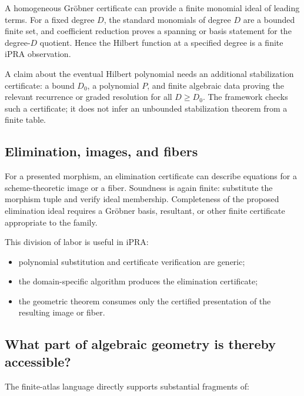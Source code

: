 A homogeneous Gröbner certificate can provide a finite monomial ideal of leading terms.  For a fixed
degree $D$, the standard monomials of degree $D$ are a bounded finite set, and coefficient reduction
proves a spanning or basis statement for the degree-$D$ quotient.  Hence the Hilbert function at a
specified degree is a finite iPRA observation.

A claim about the eventual Hilbert polynomial needs an additional stabilization certificate: a
bound $D_0$, a polynomial $P$, and finite algebraic data proving the relevant recurrence or graded
resolution for all $D\geq D_0$.  The framework checks such a certificate; it does not infer an
unbounded stabilization theorem from a finite table.

\subsection{Elimination, images, and fibers}

For a presented morphism, an elimination certificate can describe equations for a scheme-theoretic
image or a fiber.  Soundness is again finite: substitute the morphism tuple and verify ideal
membership.  Completeness of the proposed elimination ideal requires a Gröbner basis, resultant, or
other finite certificate appropriate to the family.

This division of labor is useful in iPRA:

\begin{itemize}
\item polynomial substitution and certificate verification are generic;
\item the domain-specific algorithm produces the elimination certificate;
\item the geometric theorem consumes only the certified presentation of the resulting image or
      fiber.
\end{itemize}

\subsection{What part of algebraic geometry is thereby accessible?}

The finite-atlas language directly supports substantial fragments of:

